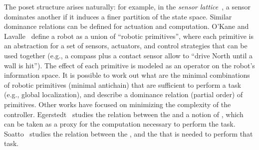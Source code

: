 The poset structure arises naturally: for example, in the \emph{sensor
lattice}~\cite{lavalle12sensing}, a sensor dominates another
if it induces a finer partition of the state space. Similar dominance
relations can be defined for actuation and computation. O'Kane and
Lavalle~\cite{okane08comparing} define a robot as a union of ``robotic
primitives'', where each primitive is an abstraction for a set of
sensors, actuators, and control strategies that can be used together
(e.g., a compass plus a contact sensor allow to ``drive North until
a wall is hit''). The effect of each primitive is modeled as an operator
on the robot's information space. It is possible to work out what
are the minimal combinations of robotic primitives (minimal antichain)
that are sufficient to perform a task (e.g., global localization),
and describe a dominance relation (partial order) of primitives. Other
works have focused on minimizing the complexity of the controller.
Egerstedt~\cite{egerstedt03motion} studies the relation between
the  and a notion of , which can be taken as
a proxy for the computation necessary to perform the task. Soatto~\cite{soatto11steps}
studies the relation between the ,
and the  that is needed to perform that
task.



\begin{example}
\end{example}


